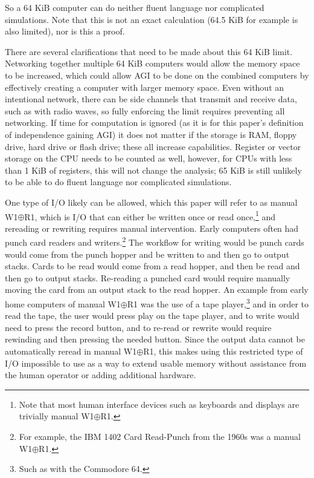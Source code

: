 \documentclass[letterpaper,twocolumn]{article}
\begin{document}
So a 64 KiB computer can do neither fluent language
nor complicated simulations. Note that this is not an exact
calculation (64.5 KiB for example is also limited), nor is this a
proof.



There are several clarifications that need to be made about this 64
KiB limit. Networking together multiple 64 KiB computers would allow
the memory space to be increased, which could allow AGI to be done on
the combined computers by effectively creating a computer with larger
memory space. Even without an intentional network, there can be side
channels that transmit and receive data, such as with radio waves, so
fully enforcing the limit requires preventing all networking. If time
for computation is ignored (as it is for this paper's definition of
independence gaining AGI) it does not matter if the storage is RAM,
floppy drive, hard drive or flash drive; these all increase
capabilities. Register or vector storage on the CPU needs to be
counted as well, however, for CPUs with less than 1 KiB of registers,
this will not change the analysis; 65 KiB is still unlikely to
be able to do fluent language nor complicated simulations.

One type of I/O likely can be allowed, which this paper will refer to
as manual W1$\oplus$R1, which is I/O that can either be written once or read
once,\footnote{Note that most human interface devices such as
keyboards and displays are trivially manual W1$\oplus$R1.} and rereading or
rewriting requires manual intervention. Early computers often had
punch card readers and writers.\footnote{For example, the IBM 1402
Card Read-Punch from the 1960s was a manual W1$\oplus$R1.} The workflow for
writing would be punch cards would come from the punch hopper and be
written to and then go to output stacks. Cards to be read would come
from a read hopper, and then be read and then go to output
stacks. Re-reading a punched card would require manually moving the
card from an output stack to the read hopper. An example from early
home computers of manual W1$\oplus$R1 was the use of a tape
player,\footnote{Such as with the Commodore 64.} and in order to read
the tape, the user would press play on the tape player, and to write
would need to press the record button, and to re-read or rewrite would
require rewinding and then pressing the needed button. Since the
output data cannot be automatically reread in manual W1$\oplus$R1, this makes
using this restricted type of I/O impossible to use as a way to extend
usable memory without assistance from the human operator or adding
additional hardware.
\end{document}
